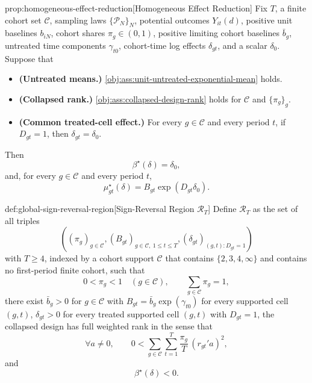 \begin{theoremv}{prop:homogeneous-effect-reduction}[Homogeneous Effect Reduction]
Fix $T$, a finite cohort set $\mathcal C$, sampling laws $\{\mathcal P_N\}_N$, potential outcomes $Y_{it}(d)$, positive unit baselines $b_{iN}$, cohort shares $\pi_g\in(0,1)$, positive limiting cohort baselines $\bar b_g$, untreated time components $\gamma_{t0}$, cohort-time log effects $\delta_{gt}$, and a scalar $\delta_0$. Suppose that
\begin{itemize}
\item \textbf{(Untreated means.)} \cref{obj:ass:unit-untreated-exponential-mean} holds.
\item \textbf{(Collapsed rank.)} \cref{obj:ass:collapsed-design-rank} holds for $\mathcal C$ and $\{\pi_g\}_g$.
\item \textbf{(Common treated-cell effect.)} For every $g\in\mathcal C$ and every period $t$, if $D_{gt}=1$, then $\delta_{gt}=\delta_0$.
\end{itemize}
Then
\[
\beta^\star(\delta)=\delta_0,
\]
and, for every $g\in\mathcal C$ and every period $t$,
\[
\mu^\star_{gt}(\delta)
=
B_{gt}\exp(D_{gt}\delta_0).
\]
\end{theoremv}

\begin{definitionv}{def:global-sign-reversal-region}[Sign-Reversal Region \(\mathcal R_T\)]
Define \(\mathcal R_T\) as the set of all triples
\[
\left((\pi_g)_{g\in\mathcal C},(B_{gt})_{g\in\mathcal C,\ 1\le t\le T},(\delta_{gt})_{(g,t):D_{gt}=1}\right)
\]
with \(T\ge 4\), indexed by a cohort support \(\mathcal C\) that contains \(\{2,3,4,\infty\}\) and contains no first-period finite cohort, such that
\[
0<\pi_g<1\quad(g\in\mathcal C),\qquad \sum_{g\in\mathcal C}\pi_g=1,
\]
there exist \(\bar b_g>0\) for \(g\in\mathcal C\) with \(B_{gt}=\bar b_g\exp(\gamma_{t0})\) for every supported cell \((g,t)\), \(\delta_{gt}>0\) for every treated supported cell \((g,t)\) with \(D_{gt}=1\), the collapsed design has full weighted rank in the sense that
\[
\forall a\ne 0,\qquad
0<\sum_{g\in\mathcal C}\sum_{t=1}^T \frac{\pi_g}{T}\,(r_{gt}'a)^2,
\]
and
\[
\beta^\star(\delta)<0.
\]
\end{definitionv}

